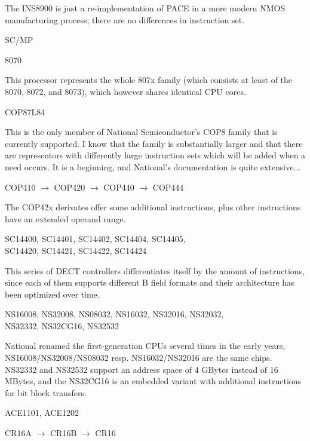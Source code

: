 \documentclass[12pt,twoside]{report}
\begin{document}
The INS8900 is just a re-implementation of PACE in a more modern
NMOS manufacturing process; there are no differences in instruction
set.
\begin{cpulist}
   SC/MP
\end{cpulist}
\begin{cpulist}
   8070
\end{cpulist}
This processor represents the whole 807x family (which consists at least
of the 8070, 8072, and 8073), which however shares identical CPU cores.
\begin{cpulist}
   COP87L84
\end{cpulist}
This is the only member of National Semiconductor's COP8 family that
is currently supported.  I know that the family is substantially
larger and that there are representors with differently large
instruction sets which will be added when a need occurs.  It is a
beginning, and National's documentation is quite extensive...
\begin{cpulist}
   COP410 $\rightarrow$ COP420 $\rightarrow$ COP440 $\rightarrow$ COP444
\end{cpulist}
The COP42x derivates offer some additional instructions, plus other
instructions have an extended operand range.
\begin{cpulist}
   SC14400, SC14401, SC14402, SC14404, SC14405, \\
\> SC14420, SC14421, SC14422, SC14424
\end{cpulist}
This series of DECT controllers differentiates itself by the amount of
instructions, since each of them supports different B field formats and
their architecture has been optimized over time.
\begin{cpulist}
   NS16008, NS32008, NS08032, NS16032, NS32016, NS32032, \\
\> NS32332, NS32CG16, NS32532
\end{cpulist}
National renamed the first-generation CPUs several times in the early
years, NS16008/NS32008/NS08032 resp. NS16032/NS32016 are the same chips.
NS32332 and NS32532 support an address space of  4 GBytes instead of 16
MBytes, and the NS32CG16 is an embedded variant with additional instructions
for bit block transfers.
\begin{cpulist}
   ACE1101, ACE1202
\end{cpulist}
\begin{cpulist}
   CR16A $\rightarrow$ CR16B $\rightarrow$ CR16
\end{cpulist}
\end{document}
